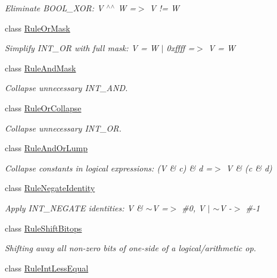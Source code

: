 \begin{DoxyCompactItemize}
\begin{DoxyCompactList}\small\item\em Eliminate B\+O\+O\+L\+\_\+\+X\+OR\+: {\ttfamily V $^\wedge$$^\wedge$ W =$>$ V != W} \end{DoxyCompactList}\item 
class \mbox{\hyperlink{class_rule_or_mask}{Rule\+Or\+Mask}}
\begin{DoxyCompactList}\small\item\em Simplify I\+N\+T\+\_\+\+OR with full mask\+: {\ttfamily V = W $\vert$ 0xffff =$>$ V = W} \end{DoxyCompactList}\item 
class \mbox{\hyperlink{class_rule_and_mask}{Rule\+And\+Mask}}
\begin{DoxyCompactList}\small\item\em Collapse unnecessary I\+N\+T\+\_\+\+A\+ND. \end{DoxyCompactList}\item 
class \mbox{\hyperlink{class_rule_or_collapse}{Rule\+Or\+Collapse}}
\begin{DoxyCompactList}\small\item\em Collapse unnecessary I\+N\+T\+\_\+\+OR. \end{DoxyCompactList}\item 
class \mbox{\hyperlink{class_rule_and_or_lump}{Rule\+And\+Or\+Lump}}
\begin{DoxyCompactList}\small\item\em Collapse constants in logical expressions\+: {\ttfamily (V \& c) \& d =$>$ V \& (c \& d)} \end{DoxyCompactList}\item 
class \mbox{\hyperlink{class_rule_negate_identity}{Rule\+Negate\+Identity}}
\begin{DoxyCompactList}\small\item\em Apply I\+N\+T\+\_\+\+N\+E\+G\+A\+TE identities\+: {\ttfamily V \& $\sim$V =$>$ \#0, V $\vert$ $\sim$V -\/$>$ \#-\/1} \end{DoxyCompactList}\item 
class \mbox{\hyperlink{class_rule_shift_bitops}{Rule\+Shift\+Bitops}}
\begin{DoxyCompactList}\small\item\em Shifting away all non-\/zero bits of one-\/side of a logical/arithmetic op. \end{DoxyCompactList}\item 
class \mbox{\hyperlink{class_rule_int_less_equal}{Rule\+Int\+Less\+Equal}}

\end{DoxyCompactItemize}
